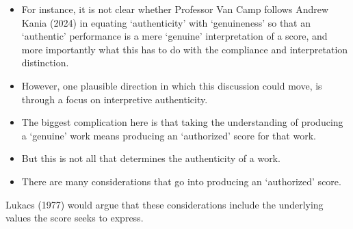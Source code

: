 \documentclass[
  letterpaper,
  DIV=11,
  numbers=noendperiod]{scrreprt}
\begin{document}
\begin{tcolorbox}[enhanced jigsaw, arc=.35mm, breakable, rightrule=.15mm, colback=white, colframe=quarto-callout-important-color-frame, bottomrule=.15mm, leftrule=.75mm, opacityback=0, toprule=.15mm, left=2mm]
\begin{tcolorbox}[enhanced jigsaw, arc=.35mm, breakable, rightrule=.15mm, colback=white, colframe=quarto-callout-tip-color-frame, bottomrule=.15mm, leftrule=.75mm, opacityback=0, toprule=.15mm, left=2mm]
\begin{itemize}
\item
  For instance, it is not clear whether Professor Van Camp follows
  Andrew Kania (2024) in equating `authenticity' with `genuineness' so
  that an `authentic' performance is a mere `genuine' interpretation of
  a score, and more importantly what this has to do with the compliance
  and interpretation distinction.
\item
  However, one plausible direction in which this discussion could move,
  is through a focus on interpretive authenticity.
\item
  The biggest complication here is that taking the understanding of
  producing a `genuine' work means producing an `authorized' score for
  that work.
\item
  But this is not all that determines the authenticity of a work.
\item
  There are many considerations that go into producing an `authorized'
  score.
\end{itemize}

Lukacs (1977) would argue that these considerations include the
underlying values the score seeks to express.


\end{tcolorbox}
\end{tcolorbox}
\end{document}
